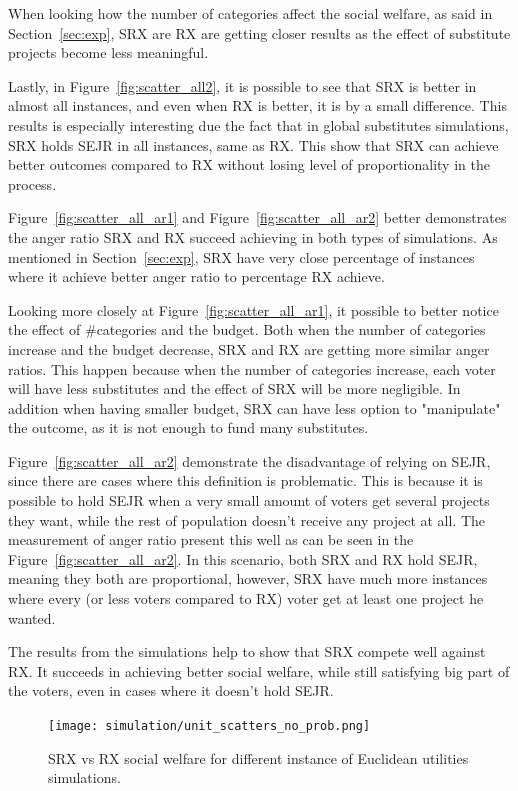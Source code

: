 \documentclass[runningheads]{llncs}
\begin{document}
\begin{subappendices}
When looking how the number of categories affect the social welfare, as said in Section~\ref{sec:exp}, SRX are RX are getting closer results as the effect of substitute projects become less meaningful.

Lastly, in Figure~\ref{fig:scatter_all2}, it is possible to see that SRX is better in almost all instances, and even when RX is better, it is by a small difference. This results is especially interesting due the fact that in global substitutes simulations, SRX holds SEJR in all instances, same as RX. This show that SRX can achieve better outcomes compared to RX without losing level of proportionality in the process.

Figure~\ref{fig:scatter_all_ar1} and Figure~\ref{fig:scatter_all_ar2} better demonstrates the anger ratio SRX and RX succeed achieving in both types of simulations. As mentioned in Section~\ref{sec:exp}, SRX have very close percentage of instances where it achieve better anger ratio to percentage RX achieve.

Looking more closely at Figure~\ref{fig:scatter_all_ar1}, it possible to better notice the effect of \#categories and the budget. Both when the number of categories increase and the budget decrease, SRX and RX are getting more similar anger ratios. This happen because when the number of categories increase, each voter will have less substitutes and the effect of SRX will be more negligible. In addition when having smaller budget, SRX can have less option to "manipulate" the outcome, as it is not enough to fund many substitutes.

Figure~\ref{fig:scatter_all_ar2} demonstrate the disadvantage of relying on SEJR, since there are cases where this definition is problematic. This is because it is possible to hold SEJR when a very small amount of voters get several projects they want, while the rest of population doesn't receive any project at all. The measurement of anger ratio present this well as can be seen in the Figure~\ref{fig:scatter_all_ar2}. In this scenario, both SRX and RX hold SEJR, meaning they both are proportional, however, SRX have much more instances where every (or less voters compared to RX) voter get at least one project he wanted.

The results from the simulations help to show that SRX compete well against RX. It succeeds in achieving better social welfare, while still satisfying big part of the voters, even in cases where it doesn't hold SEJR.


\begin{figure}[t]
\begin{center}
\texttt{[image: simulation/unit\_scatters\_no\_prob.png]}
\caption{SRX vs RX social welfare for different instance of Euclidean utilities simulations.
}\label{fig:scatter_all1}
\end{center}
\end{figure}


\end{subappendices}
\end{document}
